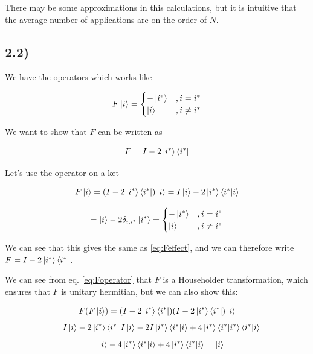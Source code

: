 \documentclass[a4paper,norsk, 10pt]{article}
\begin{document}
There may be some approximations in this calculations, but it is intuitive that the average number of applications are on the order of $N$.

\subsection{2.2)}

We have the operators which works like

\begin{equation}
F\ket{i} = 
\begin{cases}
-\ket{i^*} & , i = i^* \\
\ket{i} & , i \neq i^*
\end{cases}
\end{equation}\label{eq:Feffect}

We want to show that $F$ can be written as

\begin{equation}
F = I - 2\ket{i^*}\bra{i^*}
\end{equation}\label{eq:Foperator}

Let's use the operator on a ket

\begin{equation}
F\ket{i} = (I - 2\ket{i^*}\bra{i^*})\ket{i} = I\ket{i} - 2\ket{i^*}\bra{i^*}\ket{i}
\end{equation}

\begin{equation}
= \ket{i} - 2\delta_{i,i^*}\ket{i^*} =
\begin{cases}
-\ket{i^*} & , i = i^* \\
\ket{i} & , i \neq i^*
\end{cases}
\end{equation}

We can see that this gives the same as \eqref{eq:Feffect}, and we can therefore write $F = I - 2\ket{i^*}\bra{i^*}$.

We can see from eq. \ref{eq:Foperator} that $F$ is a Householder transformation, which ensures that $F$ is unitary hermitian, but we can also show this:

\begin{equation}
F(F\ket{i}) = (I - 2\ket{i^*}\bra{i^*})(I - 2\ket{i^*}\bra{i^*})\ket{i}
\end{equation}
\begin{equation}
= I\ket{i} - 2\ket{i^*}\bra{i^*}I\ket{i} -2I\ket{i^*}\bra{i^*}\ket{i} + 4\ket{i^*}\bra{i^*}\ket{i^*}\bra{i^*}\ket{i}
\end{equation}
\begin{equation}
= \ket{i} - 4\ket{i^*}\bra{i^*}\ket{i} + 4\ket{i^*}\bra{i^*}\ket{i} = \ket{i}
\end{equation}
\end{document}
